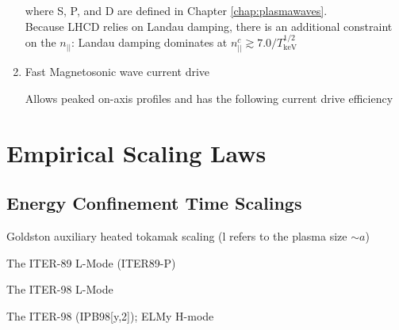 \begin{enumerate}
{

\indent where S, P, and D are defined in Chapter \ref{chap:plasmawaves}.\\
\noindent Because LHCD relies on Landau damping, there is an additional
constraint on the $n_{||}$: Landau damping dominates at $n_{||}^{c}
\gtrsim 7.0/T_{\mathrm{keV}}^{1/2}$ \cite{granatstein}
}

\item{Fast Magnetosonic wave current drive

Allows peaked on-axis profiles and has the following current drive efficiency \cite{cordey}

}

\end{enumerate}

\section{Empirical Scaling Laws}

\subsection{Energy Confinement Time Scalings}

\noindent
Goldston auxiliary heated tokamak scaling (l refers to the plasma size $\sim a$) 


\noindent
The ITER-89 L-Mode (ITER89-P) 

\noindent %
The ITER-98 L-Mode \cite{iter}

\noindent %
The ITER-98 (IPB98[y,2]); ELMy H-mode \cite{iter}

